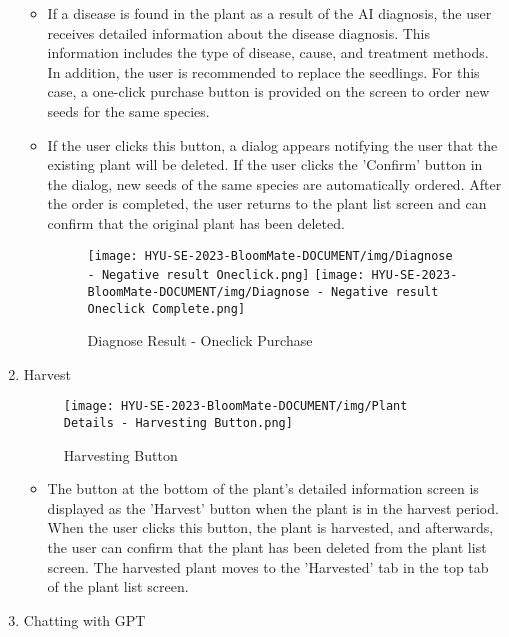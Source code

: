 \documentclass[conference, a4paper]{IEEEtran}
\begin{document}
\begin{enumerate}
\begin{itemize}
    \item If a disease is found in the plant as a result of the AI diagnosis, the user receives detailed information about the disease diagnosis. This information includes the type of disease, cause, and treatment methods. In addition, the user is recommended to replace the seedlings. For this case, a one-click purchase button is provided on the screen to order new seeds for the same species. 
    \item If the user clicks this button, a dialog appears notifying the user that the existing plant will be deleted. If the user clicks the 'Confirm' button in the dialog, new seeds of the same species are automatically ordered. After the order is completed, the user returns to the plant list screen and can confirm that the original plant has been deleted.
    \begin{figure}[h]
    \centerline{
        \texttt{[image: HYU-SE-2023-BloomMate-DOCUMENT/img/Diagnose - Negative result Oneclick.png]}
        \texttt{[image: HYU-SE-2023-BloomMate-DOCUMENT/img/Diagnose - Negative result Oneclick Complete.png]}
    }
    \label{fig}
    \caption{Diagnose Result - Oneclick Purchase}
    \end{figure}
    \end{itemize}
\item Harvest
        \begin{figure}[h]
        \centering
        \texttt{[image: HYU-SE-2023-BloomMate-DOCUMENT/img/Plant Details - Harvesting Button.png]}
        \caption{Harvesting Button}
        \label{fig:Harvesting Button}
        \end{figure}
    \begin{itemize}
        \item The button at the bottom of the plant's detailed information screen is displayed as the 'Harvest' button when the plant is in the harvest period. When the user clicks this button, the plant is harvested, and afterwards, the user can confirm that the plant has been deleted from the plant list screen. The harvested plant moves to the 'Harvested' tab in the top tab of the plant list screen.
    \end{itemize}
\item Chatting with GPT
    \begin{itemize}
        

\end{itemize}
\end{enumerate}
\end{document}
